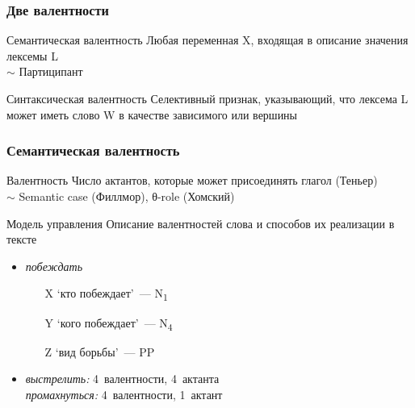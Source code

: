 \begin{frame}
  \frametitle{Две валентности}

  \begin{alertblock}{Семантическая валентность}
    Любая переменная X, входящая в описание значения лексемы L \\
    $\sim$ Партиципант
  \end{alertblock}

  \begin{alertblock}{Синтаксическая валентность}
    Селективный признак, указывающий,
    что лексема L может иметь слово W в качестве зависимого или вершины
  \end{alertblock}

  \vfill

\end{frame}

\begin{frame}
  \frametitle{Семантическая валентность}

  \begin{alertblock}{Валентность}
    Число актантов, которые может присоединять глагол (Теньер) \\
    $\sim$ Semantic case (Филлмор), θ-role (Хомский)
  \end{alertblock}

  \begin{alertblock}{Модель управления}
    Описание валентностей слова и способов их реализации в тексте
  \end{alertblock}

  \begin{multicols}{2}
    \begin{itemize}
      \item<2-> \textit{побеждать} \begin{enumerate}
        \item[X] `кто побеждает'~--- N\textsubscript{1}
        \item[Y] `кого побеждает'~--- N\textsubscript{4}
        \item[Z] `вид борьбы'~--- PP
      \end{enumerate}
    \item<3->
      \textit{выстрелить:} 4~валентности, 4~актанта \\
      \textit{промахнуться:} 4~валентности, 1~актант
    \end{itemize}
  \end{multicols}
\end{frame}
